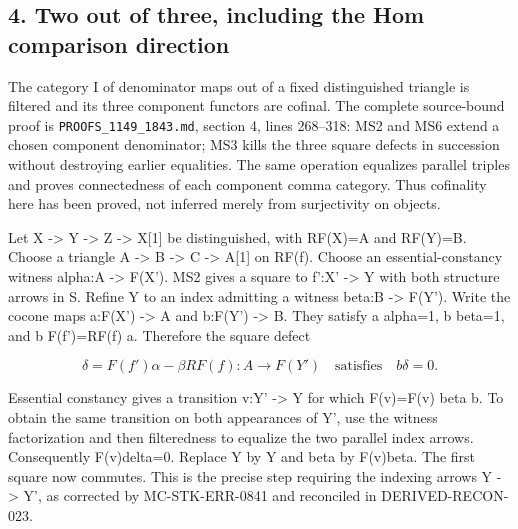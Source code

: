 \documentclass[11pt]{article}
\begin{document}
\subsection{\texorpdfstring{4. Two out of three,\allowbreak{} including the Hom comparison direction}{4. Two out of  including the Hom comparison direction}}\label{proofs-4166-5089-two-out-of-three-including-the-hom-comparison-direction}

The category I of denominator maps out of a fixed distinguished triangle is filtered and its three component functors are cofinal. The complete source-bound proof is \texttt{PROOFS\_\allowbreak{}1149\_\allowbreak{}1843.\allowbreak{}md},\allowbreak{} section 4,\allowbreak{} lines 268–\allowbreak{}318:\allowbreak{} MS2 and MS6 extend a chosen component denominator; MS3 kills the three square defects in succession without destroying earlier equalities. The same operation equalizes parallel triples and proves connectedness of each component comma category. Thus cofinality here has been proved,\allowbreak{} not inferred merely from surjectivity on objects.

Let X \allowbreak{}-> Y \allowbreak{}-> Z \allowbreak{}-> X[1]\allowbreak{} be distinguished,\allowbreak{} with RF(X)\allowbreak{}\allowbreak{}=A and RF(Y)\allowbreak{}\allowbreak{}=B. Choose a triangle A \allowbreak{}-> B \allowbreak{}-> C \allowbreak{}-> A[1]\allowbreak{} on RF(f)\allowbreak{}. Choose an essential-constancy witness alpha:\allowbreak{}A \allowbreak{}-> F(X')\allowbreak{}. MS2 gives a square to f':\allowbreak{}X' \allowbreak{}-> Y\textquotesingle{} with both structure arrows in S. Refine Y\textquotesingle{} to an index admitting a witness beta:\allowbreak{}B \allowbreak{}-> F(Y')\allowbreak{}. Write the cocone maps a:\allowbreak{}F(X')\allowbreak{} \allowbreak{}-> A and b:\allowbreak{}F(Y')\allowbreak{} \allowbreak{}-> B. They satisfy a alpha\allowbreak{}=1,\allowbreak{} b beta\allowbreak{}=1,\allowbreak{} and b F(f')\allowbreak{}\allowbreak{}=RF(f)\allowbreak{} a. Therefore the square defect

\[
 \delta=F(f')\alpha-\beta RF(f):A\longrightarrow F(Y')
 \quad\text{satisfies}\quad b\delta=0.
\]

Essential constancy gives a transition v:\allowbreak{}Y' \allowbreak{}-> Y\textquotesingle\textquotesingle{} for which F(v)\allowbreak{}\allowbreak{}=F(v)\allowbreak{} beta b. To obtain the same transition on both appearances of Y',\allowbreak{} use the witness factorization and then filteredness to equalize the two parallel index arrows. Consequently F(v)\allowbreak{}delta\allowbreak{}=0. Replace Y\textquotesingle{} by Y\textquotesingle\textquotesingle{} and beta by F(v)\allowbreak{}beta. The first square now commutes. This is the precise step requiring the indexing arrows Y \allowbreak{}-> Y',\allowbreak{} as corrected by MC-STK-ERR-0841 and reconciled in DERIVED-RECON-023.
\end{document}
